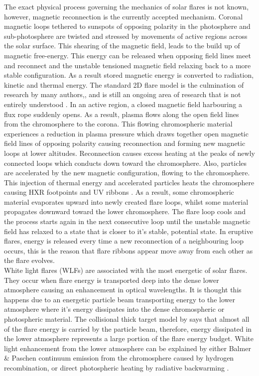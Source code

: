 The exact physical process governing the mechanics of solar flares is not known, however, magnetic reconnection is the currently accepted mechanism. Coronal magnetic loops tethered to sunspots of opposing polarity in the photosphere and sub-photosphere are twisted and stressed by movements of active regions across the solar surface. This shearing of the magnetic field, leads to the build up of magnetic free-energy. This energy can be released when opposing field lines meet and reconnect and the unstable tensioned magnetic field relaxing back to a more stable configuration. As a result stored magnetic energy is converted to radiation, kinetic and thermal energy. The standard 2D flare model is the culmination of research by many authors,\citep{1964NASSP..50..451C, 1966Natur.211..695S, 1974SoPh...34..323H, 1976SoPh...50...85K}, and is still an ongoing area of research that is not entirely understood \citep{2011LRSP....8....6S}. In an active region, a closed magnetic field harbouring a flux rope suddenly opens. As a result, plasma flows along the open field lines from the chromosphere to the corona. This flowing chromospheric material experiences a reduction in plasma pressure which draws together open magnetic field lines of opposing polarity causing reconnection and forming new magnetic loops at lower altitudes. Reconnection causes excess heating at the peaks of newly connected loops which conducts down toward the chromosphere. Also, particles are accelerated by the new magnetic configuration, flowing to the chromosphere. This injection of thermal energy and accelerated particles heats the chromosphere causing HXR footpoints \citep{1995ApJ...455..347A} and UV ribbons \citep{2009A&A...493..241F}. As a result, some chromospheric material evaporates upward into newly created flare loops, whilst some material propagates downward toward the lower chromosphere. The flare loop cools and the process starts again in the next consecutive loop until the unstable magnetic field has relaxed to a state that is closer to it's stable,  potential state. In eruptive flares, energy is released every time a new reconnection of a neighbouring loop occurs, this is the reason that flare ribbons appear move away from each other as the flare evolves. \\
White light flares (WLFs) are associated with the most energetic of solar flares. They occur when flare energy is transported deep into the dense lower atmosphere causing an enhancement in optical wavelengths. It is thought this happens due to an energetic particle beam transporting energy to the lower atmosphere where it's energy dissipates into the dense chromospheric or photospheric material. The collisional thick target model by \cite{1971SoPh...18..489B} says that almost all of the flare energy is carried by the particle beam, therefore, energy dissipated in the lower atmosphere represents a large portion of the flare energy budget. White light enhancement from the lower atmosphere can be explained by either Balmer \& Paschen continuum emission from the chromosphere caused by hydrogen recombination, or direct photospheric heating \citep{2007ASPC..368..417D} by radiative backwarming \citep{1989SoPh..124..303M}. 


